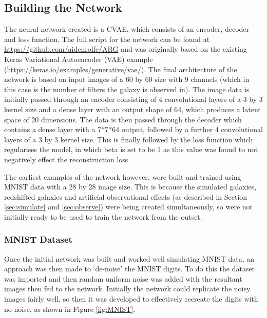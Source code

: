 \documentclass[fleqn,usenatbib]{mnras}
\begin{document}
\subsection{Building the Network}
\label{sec:network}

The neural network created is a CVAE, which consists of an encoder, decoder and loss function. The full script for the network can be found at \url{https://github.com/aidenrolfe/ARG} and was originally based on the existing Keras Variational Autoencoder (VAE) example (\url{https://keras.io/examples/generative/vae/}). The final architecture of the network is based on input images of a 60 by 60 size with 9 channels (which in this case is the number of filters the galaxy is observed in). The image data is initially passed through an encoder consisting of 4 convolutional layers of a 3 by 3 kernel size and a dense layer with an output shape of 64, which produces a latent space of 20 dimensions. The data is then passed through the decoder which contains a dense layer with a 7*7*64 output, followed by a further 4 convolutional layers of a 3 by 3 kernel size. This is finally followed by the loss function which regularises the model, in which beta is set to be 1 as this value was found to not negatively effect the reconstruction loss.

The earliest examples of the network however, were built and trained using MNIST data with a 28 by 28 image size. This is because the simulated galaxies, redshifted galaxies and artificial observational effects (as described in Section \ref{sec:simulate} and \ref{sec:observe}) were being created simultaneously, so were not initially ready to be used to train the network from the outset.

\subsubsection{MNIST Dataset}
\label{sec:network_MNIST}

Once the initial network was built and worked well simulating MNIST data, an approach was then made to ‘de-noise’ the MNIST digits. To do this the dataset was imported and then random uniform noise was added with the resultant images then fed to the network. Initially the network could replicate the noisy images fairly well, so then it was developed to effectively recreate the digits with no noise, as shown in Figure \ref{fig:MNIST}. 
\end{document}
